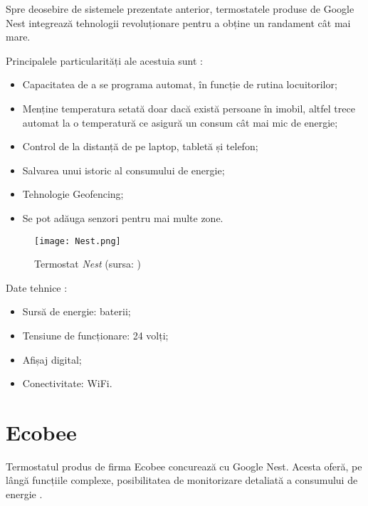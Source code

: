 	Spre deosebire de sistemele prezentate anterior, termostatele produse de Google Nest integrează tehnologii revoluționare pentru a obține un randament cât mai mare.

\vspace{2em}

	Principalele particularități ale acestuia sunt \cite{nest}:
	\begin{itemize}
	\setlength{\itemindent}{2em}
		\itemsep0em
		\item Capacitatea de a se programa automat, în funcție de rutina locuitorilor;
		\item Menține temperatura setată doar dacă există persoane în imobil, altfel trece automat la o temperatură ce asigură un consum cât mai mic de energie;
		\item Control de la distanță de pe laptop, tabletă și telefon;
		\item Salvarea unui istoric al consumului de energie;
		\item Tehnologie Geofencing;
		\item Se pot adăuga senzori pentru mai multe zone.
	\end{itemize}

\vspace{1em}

\begin{wrapfigure}[5]{l}{0.5\textwidth}
	\centering
	\texttt{[image: Nest.png]}
	\caption{Termostat \textit{Nest} (sursa: \cite{nest})}
\end{wrapfigure}

	Date tehnice \cite{nest}:
	\begin{itemize}
	\setlength{\itemindent}{2em}
		\itemsep0em
		\item Sursă de energie: baterii;
		\item Tensiune de funcționare: 24 volți;
		\item Afișaj digital;
		\item Conectivitate: WiFi.
	\end{itemize}

\vspace{3em}


\section{Ecobee}
	 Termostatul produs de firma Ecobee concurează cu Google Nest. Acesta oferă, pe lângă funcțiile complexe, posibilitatea de monitorizare detaliată a consumului de energie \cite{ecobee}.
	
